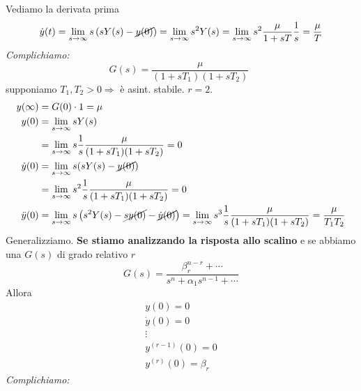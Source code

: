 \documentclass[10pt,a4paper]{book}
\begin{document}
Vediamo la derivata prima
\begin{equation*}
\dot{y}(t) =\lim _{s\rightarrow \infty } s\left( sY( s) -\cancel{y( 0)}\right) =\lim _{s\rightarrow \infty } s^{2} Y( s) =\lim _{s\rightarrow \infty } s^{2}\frac{\mu }{1+sT}\frac{1}{s} =\frac{\mu }{T}
\end{equation*}
\textit{Complichiamo:}
\begin{equation*}
G(s)=\frac{\mu }{( 1+sT_1)( 1+sT_2)} \ \ 
\end{equation*}
supponiamo $T_1 ,T_2  >0\Rightarrow $ è asint. stabile. $r=2$.
\begin{equation*}
\begin{aligned}
y(\infty ) & =G(0)\cdot 1=\mu \\
y(0) & =\lim _{s\rightarrow \infty } sY(s)\\
 & =\lim _{s\rightarrow \infty } s\frac{1}{s}\frac{\mu }{( 1+sT_1)( 1+sT_2)} =0\\
\dot{y} (0) & =\lim _{s\rightarrow \infty } s(sY(s)-\cancel{y(0)} )\\
 & =\lim _{s\rightarrow \infty } s^{2}\frac{1}{s}\frac{\mu }{( 1+sT_1)( 1+sT_2)} =0\\
\ddot{y} (0) & =\lim _{s\rightarrow \infty } s\left( s^{2} Y(s)-\cancel{sy(0)} -\cancel{\dot{y} (0)}\right) =\lim _{s\rightarrow \infty } s^{3}\frac{1}{s}\frac{\mu }{( 1+sT_1)( 1+sT_2)} =\frac{\mu }{T_1 T_2}
\end{aligned}
\end{equation*}
Generalizziamo. \textbf{Se stiamo analizzando la risposta allo scalino} e se abbiamo una $G( s)$ di grado relativo $r$
\begin{equation*}
G( s) =\frac{\beta ^{n-r}_r +\cdots }{s^{n} +\alpha _1 s^{n-1} +\cdots }
\end{equation*}
Allora
\begin{equation*}
\boxed{\begin{array}{ c }
y( 0) =0\\
\dot{y}( 0) =0\\
\vdots \\
y^{( r-1)}( 0) =0\\
y^{( r)}( 0) =\beta _r
\end{array}}
\end{equation*}
\textit{Complichiamo:}
\end{document}
